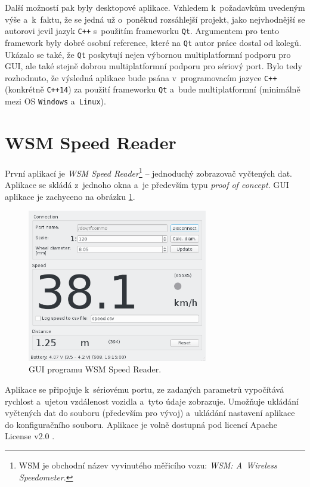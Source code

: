 Další možností pak byly desktopové aplikace. Vzhledem k~požadavkům uvedeným
výše a~k~faktu, že se jedná už o~poněkud rozsáhlejší projekt, jako nejvhodnější
se autorovi jevil jazyk \texttt{C++} s~použitím frameworku \texttt{Qt}.
Argumentem pro tento framework byly dobré osobní reference, které na
\texttt{Qt} autor práce dostal od kolegů. Ukázalo se také, že \texttt{Qt} poskytují
nejen výbornou multiplatformní podporu pro GUI, ale také stejně dobrou
multiplatformní podporu pro sériový port. Bylo tedy rozhodnuto, že výsledná
aplikace bude psána v~programovacím jazyce \texttt{C++} (konkrétně
\texttt{C++14}) za použití frameworku \texttt{Qt} a~bude multiplatformní
(minimálně mezi OS \texttt{Windows} a~\texttt{Linux}).

\section{\gls{WSM} Speed Reader}
\label{sec:sw-wsm-speed-reader}

První aplikací je \textit{\gls{WSM} Speed Reader}\footnote{\gls{WSM} je obchodní název
vyvinutého měřicího vozu: \textit{\gls{WSM}: A~Wireless Speedometer}.} -- jednoduchý
zobrazovač vyčtených dat. Aplikace se skládá z~jednoho okna a~je především typu
\textit{proof of concept}. GUI aplikace je zachyceno na obrázku
\ref{fig:wsm-speed-reader-gui}.

\begin{figure}[ht]
\includegraphics[width=0.7\textwidth]{data/speed_reader_screenshot.png}
\caption{GUI programu \gls{WSM} Speed Reader.}
\label{fig:wsm-speed-reader-gui}
\end{figure}

Aplikace se připojuje k~sériovému portu, ze zadaných parametrů vypočítává
rychlost a~ujetou vzdálenost vozidla a~tyto údaje zobrazuje. Umožňuje ukládání
vyčtených dat do souboru (především pro vývoj) a~ukládání nastavení aplikace
do konfiguračního souboru. Aplikace je volně dostupná pod licencí Apache
License v2.0 \cite{wsm-speed-reader}.

